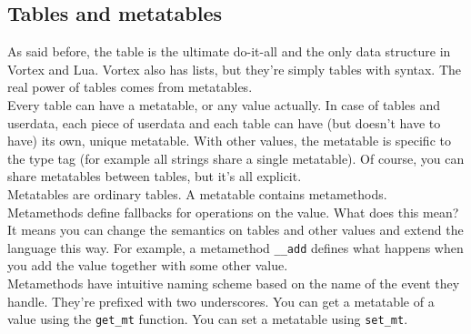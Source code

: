 \documentclass{article}
\begin{document}
\subsection{Tables and metatables}
As said before, the table is the ultimate do-it-all and the only data structure
in Vortex and Lua. Vortex also has lists, but they're simply tables with
syntax. The real power of tables comes from metatables.\\
Every table can have a metatable, or any value actually. In case of tables
and userdata, each piece of userdata and each table can have (but doesn't
have to have) its own, unique metatable. With other values, the metatable
is specific to the type tag (for example all strings share a single
metatable). Of course, you can share metatables between tables, but
it's all explicit.\\
Metatables are ordinary tables. A metatable contains metamethods. Metamethods
define fallbacks for operations on the value. What does this mean? It means
you can change the semantics on tables and other values and extend the
language this way. For example, a metamethod \verb|__add| defines
what happens when you add the value together with some other value.\\
Metamethods have intuitive naming scheme based on the name of the event
they handle. They're prefixed with two underscores. You can get a metatable
of a value using the \verb|get_mt| function. You can set a metatable using
\verb|set_mt|.
\end{document}

